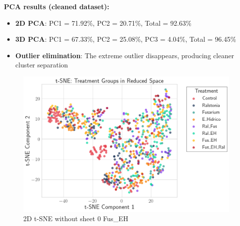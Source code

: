 \documentclass[12pt,a4paper]{article}
\begin{document}
\textbf{PCA results (cleaned dataset):}
\begin{itemize}
    \item \textbf{2D PCA}: PC1 = 71.92\%, PC2 = 20.71\%, Total = 92.63\%
    \item \textbf{3D PCA}: PC1 = 67.33\%, PC2 = 25.08\%, PC3 = 4.04\%, Total = 96.45\%
    \item \textbf{Outlier elimination}: The extreme outlier disappears, producing cleaner cluster separation
\end{itemize}

\begin{figure}[H]
    \centering

        \includegraphics[width=\textwidth]{Plots/TSNE_Without_FusEH0.png}
        \caption{2D t-SNE without sheet 0 Fus\_EH}
        \label{fig:tsne_without_fus0}

 
\end{figure}
\end{document}
